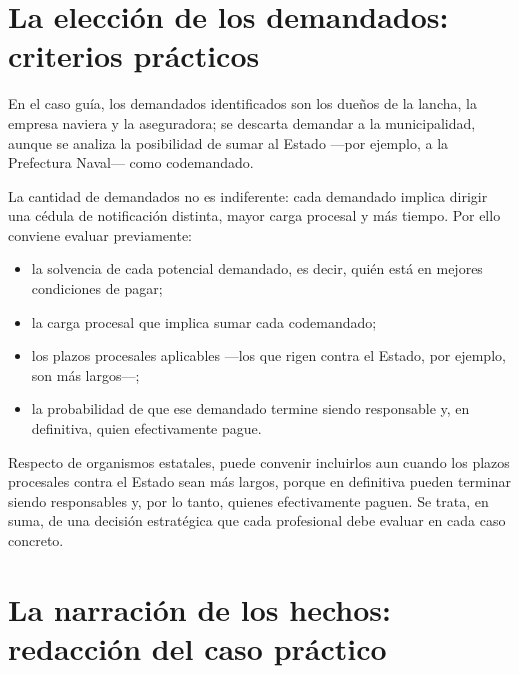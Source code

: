 \documentclass[12pt,oneside]{book}
\begin{document}
\section{La elección de los demandados: criterios prácticos}

En el caso guía, los demandados identificados son los dueños de la lancha, la empresa naviera y la aseguradora; se descarta demandar a la municipalidad, aunque se analiza la posibilidad de sumar al Estado —por ejemplo, a la Prefectura Naval— como codemandado.

La cantidad de demandados no es indiferente: cada demandado implica dirigir una cédula de notificación distinta, mayor carga procesal y más tiempo. Por ello conviene evaluar previamente:

\begin{itemize}
    \item la solvencia de cada potencial demandado, es decir, quién está en mejores condiciones de pagar;
    \item la carga procesal que implica sumar cada codemandado;
    \item los plazos procesales aplicables —los que rigen contra el Estado, por ejemplo, son más largos—;
    \item la probabilidad de que ese demandado termine siendo responsable y, en definitiva, quien efectivamente pague.
\end{itemize}

Respecto de organismos estatales, puede convenir incluirlos aun cuando los plazos procesales contra el Estado sean más largos, porque en definitiva pueden terminar siendo responsables y, por lo tanto, quienes efectivamente paguen. Se trata, en suma, de una decisión estratégica que cada profesional debe evaluar en cada caso concreto.

\section{La narración de los hechos: redacción del caso práctico}
\end{document}
